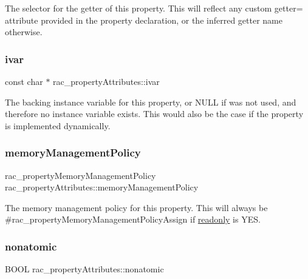 The selector for the getter of this property. This will reflect any custom {\ttfamily getter=} attribute provided in the property declaration, or the inferred getter name otherwise. \mbox{\label{structrac__property_attributes_ae91fbfecdff5d2e465a1a6f6b784d9bd}} 
\subsubsection{\texorpdfstring{ivar}{ivar}}
{\footnotesize\ttfamily const char $\ast$ rac\+\_\+property\+Attributes\+::ivar}

The backing instance variable for this property, or {\ttfamily N\+U\+LL} if {\ttfamily {\ttfamily } } was not used, and therefore no instance variable exists. This would also be the case if the property is implemented dynamically. \mbox{\label{structrac__property_attributes_a7a204711220b63a21ced867e5eb173df}} 
\subsubsection{\texorpdfstring{memory\+Management\+Policy}{memoryManagementPolicy}}
{\footnotesize\ttfamily rac\+\_\+property\+Memory\+Management\+Policy rac\+\_\+property\+Attributes\+::memory\+Management\+Policy}

The memory management policy for this property. This will always be \#rac\+\_\+property\+Memory\+Management\+Policy\+Assign if \mbox{\hyperlink{structrac__property_attributes_abb7d2cfe35836a37e19bba2982a9f063}{readonly}} is {\ttfamily Y\+ES}. \mbox{\label{structrac__property_attributes_a3bef2ed70200ccc5d4ca48613e49ab2a}} 
\subsubsection{\texorpdfstring{nonatomic}{nonatomic}}
{\footnotesize\ttfamily B\+O\+OL rac\+\_\+property\+Attributes\+::nonatomic}

